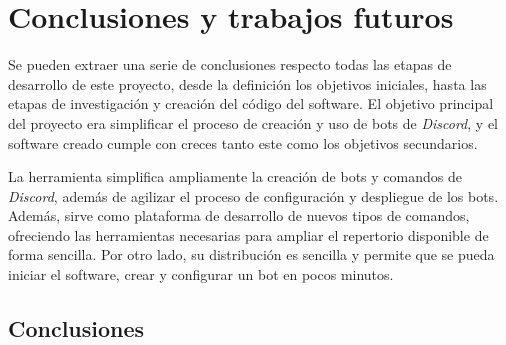 \chapter{Conclusiones y trabajos futuros}

Se pueden extraer una serie de conclusiones respecto todas las etapas de desarrollo de este proyecto, desde la definición los objetivos iniciales, hasta las etapas de investigación y creación del código del software. El objetivo principal del proyecto era simplificar el proceso de creación y uso de bots de \textit{Discord}, y el software creado cumple con creces tanto este como los objetivos secundarios.

La herramienta simplifica ampliamente la creación de bots y comandos de \textit{Discord}, además de agilizar el proceso de configuración y despliegue de los bots. Además, sirve como plataforma de desarrollo de nuevos tipos de comandos, ofreciendo las herramientas necesarias para ampliar el repertorio disponible de forma sencilla. Por otro lado, su distribución es sencilla y permite que se pueda iniciar el software, crear y configurar un bot en pocos minutos.

\section{Conclusiones}

